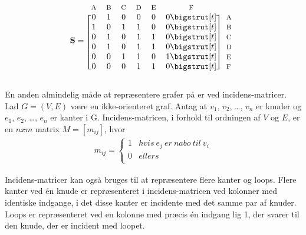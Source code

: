  \begin{equation*}
  \mathbf{S}=
  \begin{blockarray}{*{6}{c} l}
    \begin{block}{*{6}{>{$\footnotesize}c<{$}} l}
      A & B & C & D & E & F \\
    \end{block}
    \begin{block}{[*{6}{c}]>{$\footnotesize}l<{$}}
      0 & 1 & 0 & 0 & 0 & 0 \bigstrut[t]& A \\
      1 & 0 & 1 & 1 & 0 & 0 \bigstrut[t]&B \\
      0 & 1 & 0 & 1 & 1 & 0 \bigstrut[t]&C \\
      0 & 1 & 0 & 1 & 1 & 0 \bigstrut[t]& D \\
      0 & 0 & 1 & 1 & 0 & 1 \bigstrut[t]& E \\
      0 & 0 & 0 & 1 & 1 & 0 \bigstrut[t]& F \\
    \end{block}
  \end{blockarray}
\end{equation*}

En anden almindelig måde at repræsentere grafer på er ved incidens-matricer. Lad $G=(V,E)$ være en ikke-orienteret graf. Antag at $v_1$, $v_2$, \dots , $v_n$ er knuder og $e_1$, $e_2$, \dots , $e_n$ er kanter i G. Incidens-matricen, i forhold til ordningen af $V$ og $E$, er en $n x m$ matrix $M=[m_{ij}]$, hvor 
\begin{align*}
m_{ij}= \left\{\begin{array}{cc}
1 & hvis \  {e_j} \  er \  nabo \ til \ v_i \\
0 & ellers \\
\end{array}\right.
\end{align*}

Incidens-matricer kan også bruges til at repræsentere flere kanter og loops. Flere kanter ved én knude er repræsenteret i incidens-matricen ved kolonner med identiske indgange, i det disse kanter er incidente med det samme par af knuder. Loops er repræsenteret ved en kolonne med præcis én indgang lig 1, der svarer til den knude, der er incident med loopet. 






